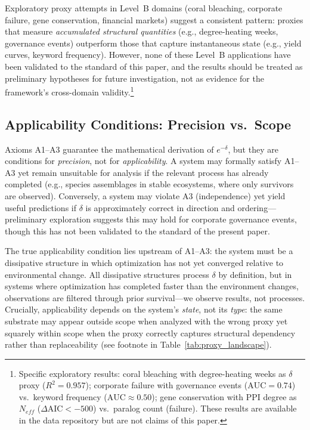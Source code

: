 \documentclass[11pt,a4paper]{article}
\begin{document}
Exploratory proxy attempts in Level~B domains (coral bleaching, corporate failure, gene conservation, financial markets) suggest a consistent pattern: proxies that measure \emph{accumulated structural quantities} (e.g., degree-heating weeks, governance events) outperform those that capture instantaneous state (e.g., yield curves, keyword frequency). However, none of these Level~B applications have been validated to the standard of this paper, and the results should be treated as preliminary hypotheses for future investigation, not as evidence for the framework's cross-domain validity.\footnote{Specific exploratory results: coral bleaching with degree-heating weeks as $\delta$ proxy ($R^2 = 0.957$); corporate failure with governance events ($\text{AUC} = 0.74$) vs.\ keyword frequency ($\text{AUC} \approx 0.50$); gene conservation with PPI degree as $N_{eff}$ ($\Delta\text{AIC} < -500$) vs.\ paralog count (failure). These results are available in the data repository but are not claims of this paper.}

\subsection{Applicability Conditions: Precision vs.\ Scope}

Axioms A1--A3 guarantee the mathematical derivation of $e^{-\delta}$, but they are conditions for \emph{precision}, not for \emph{applicability}. A system may formally satisfy A1--A3 yet remain unsuitable for analysis if the relevant process has already completed (e.g., species assemblages in stable ecosystems, where only survivors are observed). Conversely, a system may violate A3 (independence) yet yield useful predictions if $\delta$ is approximately correct in direction and ordering---preliminary exploration suggests this may hold for corporate governance events, though this has not been validated to the standard of the present paper.

The true applicability condition lies upstream of A1--A3: the system must be a dissipative structure in which optimization has not yet converged relative to environmental change. All dissipative structures process $\delta$ by definition, but in systems where optimization has completed faster than the environment changes, observations are filtered through prior survival---we observe results, not processes. Crucially, applicability depends on the system's \emph{state}, not its \emph{type}: the same substrate may appear outside scope when analyzed with the wrong proxy yet squarely within scope when the proxy correctly captures structural dependency rather than replaceability (see footnote in Table~\ref{tab:proxy_landscape}).
\end{document}
